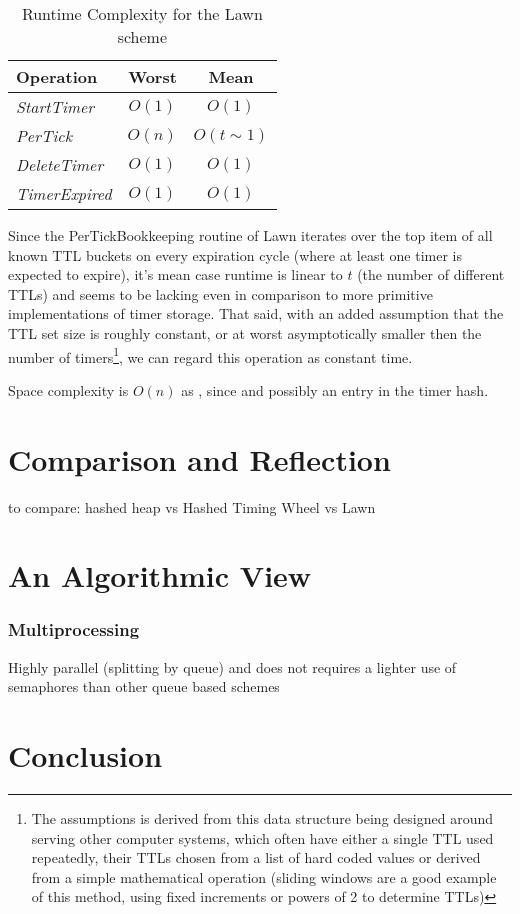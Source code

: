 \documentclass[twocolumn,a4paper]{article}
\newcommand{\advcomplexity}[9]{
\begin{table}[h!]
	\begin{center}
		\begin{tabular}{l|c|c}
			\textbf{Operation} & \textbf{Worst} & \textbf{Mean} \\
			\hline
			\textit{StartTimer} & $O(#1)$ & $O(#2)$ \\
			\textit{PerTick} & $O(#3)$ & $O(#4)$ \\
			\textit{DeleteTimer} & $O(#5)$ & $O(#6)$ \\
			\textit{TimerExpired} & $O(#7)$ & $O(#8)$ \\
		\end{tabular}
		\caption{Runtime Complexity for #9 scheme}
		\label{tab:table1}
	\end{center}
\end{table}
}
\begin{document}
\advcomplexity{1}{1}{n}{t\sim1}{1}{1}{1}{1}{the Lawn}

Since the PerTickBookkeeping routine of Lawn iterates over the top item of all known TTL buckets on every expiration cycle (where at least one timer is expected to expire), it's mean case runtime is linear to $t$ (the number of different TTLs) and seems to be lacking even in comparison to more primitive implementations of timer storage. That said, with an added assumption that the TTL set size is roughly constant, or at worst asymptotically smaller then the number of timers\footnote{The assumptions is derived from this data structure being designed around serving other computer systems, which often have either a single TTL used repeatedly, their TTLs chosen from a list of hard coded values or derived from a simple mathematical operation (sliding windows are a good example of this method, using fixed increments or powers of 2 to determine TTLs)}, we can regard this operation as constant time.



Space complexity is $O(n)$ as , since  and possibly an entry in the timer hash.

\section{Comparison and Reflection}

to compare:
hashed heap
vs
Hashed Timing Wheel
vs 
Lawn

\section{An Algorithmic View}

\subsubsection{Multiprocessing}
Highly parallel (splitting by queue) and does not requires a lighter use of semaphores  than other queue based schemes

\section{Conclusion}



\end{document}
